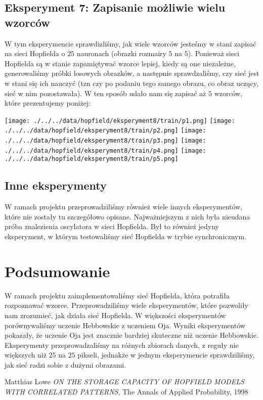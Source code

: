 \documentclass{article}
\begin{document}
\subsection{Eksperyment 7: Zapisanie możliwie wielu wzorców}
W tym eksperymencie sprawdizliśmy, jak wiele wzorców jesteśmy w stani zapisać na sieci Hopfielda o
$25$ nauronach (obrazki rozmairy $5$ na $5$). Ponieważ sieci Hopfielda są w stanie zapamiętywać 
wzorce lepiej, kiedy są one niezależne, generowaliśmy próbki losowych obrazków, a następnie sprawdzaliśmy,
czy sieć jest w stani się ich nauczyć (tzn czy po podaniu tego samego obrazu, co obraz uczący, sieć w nim pozostawała).
W ten sposób udało nam się zapisać aż $5$ wzorców, które prezentujemy poniżej:
\begin{center}
    \texttt{[image: ./../../data/hopfield/eksperyment8/train/p1.png]}
    \texttt{[image: ./../../data/hopfield/eksperyment8/train/p2.png]}
    \texttt{[image: ./../../data/hopfield/eksperyment8/train/p3.png]}
    \texttt{[image: ./../../data/hopfield/eksperyment8/train/p4.png]}
    \texttt{[image: ./../../data/hopfield/eksperyment8/train/p5.png]}
\end{center}

\subsection{Inne eksperymenty}
W ramach projektu przeprowadziliśmy również wiele innych eksperymentów, które nie zostały tu szczegółowo opisane.
Najważniejszym z nich była nieudana próba znalezienia oscylatora w sieci Hopfielda.
Był to również jedyny eksperyment, w którym testowaliśmy sieć Hopfielda w trybie synchronicznym.

\section{Podsumowanie}
W ramach projektu zaimplementowaliśmy sieć Hopfielda, która potrafiła rozpoznawać wzorce.
Przeprowadziliśmy wiele eksperymentów, które pozwoliły nam zrozumieć, jak działa sieć Hopfielda.
W większości eksperymentów porównywaliśmy uczenie Hebbowskie z uczeniem Oja.
Wyniki eksperymentów pokazały, że uczenie Oja jest znacznie bardziej skuteczne niż uczenie Hebbowskie.
Eksperymenty przeprowadzaliśmy na różnych zbiorach danych, z reguły nie większych niż $25$ na $25$ pikseli,
jednakże w jednym eksperymencie sprawdziliśmy, jak sieć radzi sobie z dużymi obrazami.



\begin{thebibliography}{9}

    Matthias Lowe
    \textit{ON THE STORAGE CAPACITY OF HOPFIELD
    MODELS WITH CORRELATED PATTERNS},
    The Annals of Applied Probability, 1998
\end{thebibliography}
\end{document}
